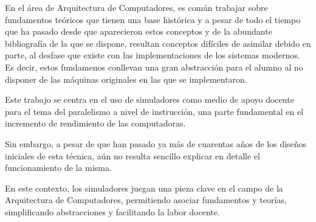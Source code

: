 En el área de Arquitectura de Computadores, es común trabajar sobre fundamentos teóricos
que tienen una base histórica y a pesar de todo el tiempo que ha pasado desde 
que aparecieron estos conceptos y de la abundante bibliografía de la que se
dispone, resultan conceptos difíciles de asimilar debido en parte, al desfase que existe
con las implementaciones de los sistemas modernos. Es decir, estos 
fundamenos conllevan una gran abstracción para el alumno al no disponer de las máquinas originales
en las que se implementaron.

\bigskip
Este trabajo se centra en el uso de simuladores como medio de apoyo docente para el 
tema del  paralelismo a nivel de instrucción, una parte fundamental en el incremento
de rendimiento de las computadoras.

\bigskip
Sin embargo, a pesar de que han pasado ya más de cuarentas años de los diseños iniciales de esta 
técnica, aún no resulta sencillo explicar en detalle el funcionamiento de la misma.

\bigskip
En este contexto, los simuladores juegan una pieza clave en el campo de la Arquitectura de Computadores,
permitiendo asociar fundamentos y teorías, simplificando abstracciones y facilitando la labor docente.